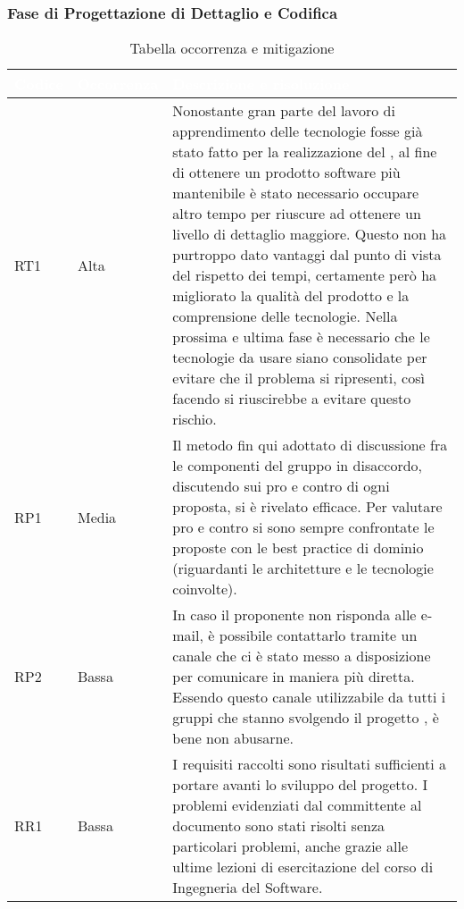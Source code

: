 \subsubsection{Fase di Progettazione di Dettaglio e Codifica}
{
\renewcommand{\arraystretch}{2}
\centering
\begin{longtable}{C{2cm} C{3cm} C{10cm}}
\caption{Tabella occorrenza e mitigazione}\\

\textcolor{white}{\textbf{Codice}} & 
\textcolor{white}{\textbf{Occorrenza}} & 
\textcolor{white}{\textbf{Descrizione e risoluzione}}\\	
\endhead

RT1 &
Alta &
Nonostante gran parte del lavoro di apprendimento delle tecnologie fosse già stato fatto per la realizzazione del , al fine di ottenere un prodotto software più mantenibile è stato necessario occupare altro tempo per riuscure ad ottenere un livello di dettaglio maggiore. Questo non ha purtroppo dato vantaggi dal punto di vista del rispetto dei tempi, certamente però ha migliorato la qualità del prodotto e la comprensione delle tecnologie. Nella prossima e ultima fase è necessario che le tecnologie da usare siano consolidate per evitare che il problema si ripresenti, così facendo si riuscirebbe a evitare questo rischio. \\

RP1 &
Media &
Il metodo fin qui adottato di discussione fra le componenti del gruppo in disaccordo, discutendo sui pro e contro di ogni proposta, si è rivelato efficace. Per valutare pro e contro si sono sempre confrontate le proposte con le best practice di dominio (riguardanti le architetture e le tecnologie coinvolte). \\

RP2 &
Bassa &
In caso il proponente non risponda alle e-mail, è possibile contattarlo tramite un canale  che ci è stato messo a disposizione per comunicare in maniera più diretta. Essendo questo canale utilizzabile da tutti i gruppi che stanno svolgendo il progetto \NomeProgetto{}, è bene non abusarne. \\

RR1 &
Bassa &
I requisiti raccolti sono risultati sufficienti a portare avanti lo sviluppo del progetto. I problemi evidenziati dal committente al documento \AdR{} sono stati risolti senza particolari problemi, anche grazie alle ultime lezioni di esercitazione del corso di Ingegneria del Software. \\


\end{longtable}}
